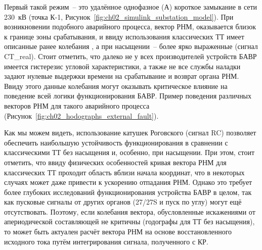 Первый такой режим~-- это удалённое однофазное (А) короткое замыкание в сети 230~кВ (точка К-1, Рисунок~\ref{fig:ch02_simulink_substation_model}). При возникновении подобного аварийного процесса, вектор РНМ, оказывается близок к границе зоны срабатывания, и ввиду использования классических ТТ имеет описанные ранее колебания \cite{evdakov_rogowski_abstract_2024}, а при насыщении~-- более ярко выраженные (сигнал CT\_real). Стоит отметить, что далеко не у всех производителей устройств БАВР имеется гистерезис угловой характеристики, а также не все службы наладки задают нулевые выдержки времени на срабатывание и возврат органа РНМ. Ввиду этого данные колебания могут оказывать критическое влияние на поведение всей логики функционирования БАВР. Пример поведения различных векторов РНМ для такого аварийного процесса (Рисунок~\ref{fig:ch02_hodographs_external_fault}).

Как мы можем видеть, использование катушек Роговского (сигнал RC) позволяет обеспечить
наибольшую устойчивость функционирования в сравнении с классическими ТТ без насыщения и,
особенно, при насыщении. При этом, стоит отметить, что ввиду физических особенностей
кривая вектора РНМ для классических ТТ проходит область вблизи начала координат, что в
некоторых случаях может даже привести к ускорению отпадания РНМ. Однако это требует
более глубоких исследований функционирования устройства БАВР в целом, так как пусковые
сигналы от других органов (27/27S и пуск по углу) могут ещё отсутствовать. Поэтому, если
колебания вектора, обусловленные искажениями от апериодической составляющей не критичны
(годографы для ТТ без насыщения), то может быть актуален расчёт вектора РНМ на основе
восстановленного исходного тока путём интегрирования сигнала, полученного с КР.

